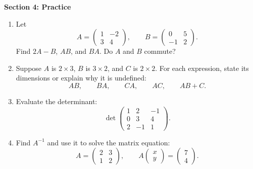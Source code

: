 \documentclass[11pt]{article}
\begin{document}
\newpage
\begin{center}{\large\textbf{Section 4: Practice}}\end{center}
\begin{enumerate}[leftmargin=*,itemsep=0pt,series=chapterEleven]
  \item Let
  \[
    A=\begin{pmatrix}1&-2\\3&4\end{pmatrix},\qquad
    B=\begin{pmatrix}0&5\\-1&2\end{pmatrix}.
  \]
  Find $2A-B$, $AB$, and $BA$. Do $A$ and $B$ commute?
  \par{}

  \item Suppose $A$ is $2\times3$, $B$ is $3\times2$, and $C$ is $2\times2$.
  For each expression, state its dimensions or explain why it is undefined:
  \[
    AB,\qquad BA,\qquad CA,\qquad AC,\qquad AB+C.
  \]
  \par{}

  \item Evaluate the determinant:
  \[
    \det\begin{pmatrix}1&2&-1\\0&3&4\\2&-1&1\end{pmatrix}.
  \]
  \par{}

  \item Find $A^{-1}$ and use it to solve the matrix equation:
  \[
    A=\begin{pmatrix}2&3\\1&2\end{pmatrix},\qquad
    A\begin{pmatrix}x\\y\end{pmatrix}=\begin{pmatrix}7\\4\end{pmatrix}.
  \]
  \par{}
\end{enumerate}
\end{document}
